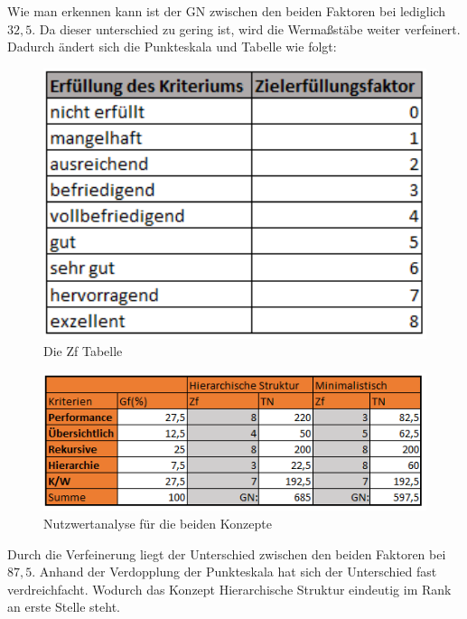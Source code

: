 Wie man erkennen kann ist der \ac{GN} zwischen den beiden Faktoren bei lediglich $32,5$.
Da dieser unterschied zu gering ist, wird die Wermaßstäbe weiter verfeinert.
Dadurch ändert sich die Punkteskala und Tabelle wie folgt:
\begin{figure}[h!]
 \centering
 \includegraphics[width=1\textwidth]{gfx/Picture/Ziel2.PNG}
 \caption{Die Zf Tabelle}
 \label{fig:Ziel}
\end{figure}
\newpage
\begin{figure}[h!]
 \centering
 \includegraphics[width=1\textwidth]{gfx/Picture/Nutzwert2.PNG}
 \caption{Nutzwertanalyse für die beiden Konzepte}
 \label{fig:Nutz}
\end{figure}
Durch die Verfeinerung liegt der Unterschied zwischen den beiden Faktoren bei $87,5$.
Anhand der Verdopplung der Punkteskala hat sich der Unterschied fast verdreichfacht.
Wodurch das Konzept Hierarchische Struktur eindeutig im Rank an erste Stelle steht.

